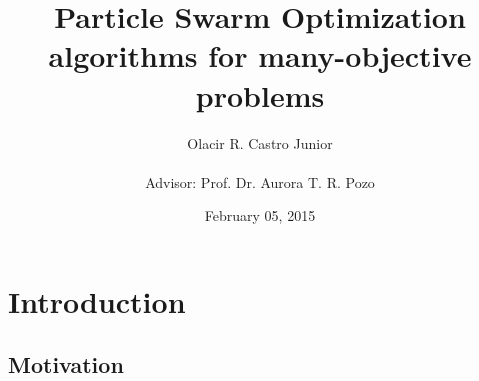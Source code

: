 \documentclass{beamer}
\title{ \textbf{Particle Swarm Optimization algorithms for many-objective problems} }
\author{Olacir R. Castro Junior \\ \quad \\ \small{Advisor: Prof. Dr. Aurora T. R. Pozo} }
\institute{Computer Science's Department\\ Federal University of Paraná}
\begin{document}

\date{February 05, 2015}

\frame{
	\titlepage

}



\section{Introduction}
\subsection{Motivation}
\end{document}
